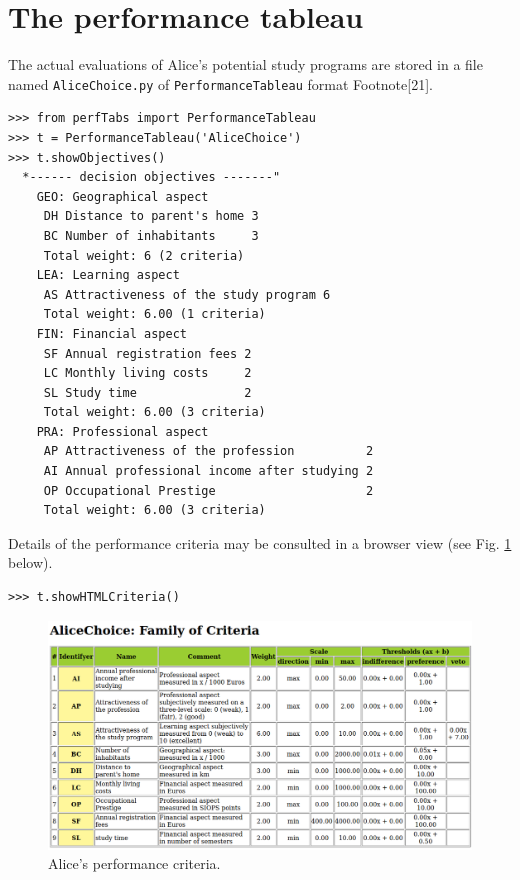 \section{The performance tableau}
\label{sec:12.2}

The actual evaluations of Alice's potential study programs are stored in a file named \texttt{AliceChoice.py} of \texttt{PerformanceTableau} format Footnote[21].

\begin{lstlisting}[caption={Alice's performance tableau},label=list:12.1]
>>> from perfTabs import PerformanceTableau
>>> t = PerformanceTableau('AliceChoice')
>>> t.showObjectives()
  *------ decision objectives -------"
    GEO: Geographical aspect
     DH Distance to parent's home 3
     BC Number of inhabitants     3
     Total weight: 6 (2 criteria)
    LEA: Learning aspect
     AS Attractiveness of the study program 6
     Total weight: 6.00 (1 criteria)
    FIN: Financial aspect
     SF Annual registration fees 2
     LC Monthly living costs     2
     SL Study time               2
     Total weight: 6.00 (3 criteria)
    PRA: Professional aspect
     AP Attractiveness of the profession          2
     AI Annual professional income after studying 2
     OP Occupational Prestige                     2
     Total weight: 6.00 (3 criteria)
\end{lstlisting}

Details of the performance criteria may be consulted in a browser view (see Fig. \ref{fig:12.2} below).

\begin{lstlisting}
>>> t.showHTMLCriteria()
\end{lstlisting}
\begin{figure}[h]
\includegraphics[width=12cm]{Figures/aliceCriteria.png}
\caption{Alice's performance criteria.}
\label{fig:12.2}       %
\end{figure}

